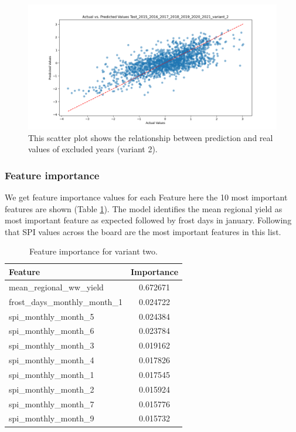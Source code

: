 \documentclass{article}
\begin{document}
\begin{figure}[H]
	\centering
	\includegraphics[width=1.0\textwidth]{./plots/scatter_Test_2015_2016_2017_2018_2019_2020_2021_variant_2.png}
	\caption{\label{fig:scatter_excluded_years_variant_2}This scatter plot shows the relationship between prediction and real values of excluded years (variant 2).}
\end{figure}
\subsubsection{Feature importance}
We get feature importance values for each Feature here the 10 most important features are shown (Table \ref{table:feature_importance_variant_2}).
The model identifies the mean regional yield as most important feature as expected followed by frost days in january. Following that SPI values across the board are the most important features in this list.
\begin{table}[H]
	\centering
	\begin{tabular}{lc}
		\hline
		Feature                        & Importance \\
		\hline
		mean\_regional\_ww\_yield      & 0.672671   \\
		frost\_days\_monthly\_month\_1 & 0.024722   \\
		spi\_monthly\_month\_5         & 0.024384   \\
		spi\_monthly\_month\_6         & 0.023784   \\
		spi\_monthly\_month\_3         & 0.019162   \\
		spi\_monthly\_month\_4         & 0.017826   \\
		spi\_monthly\_month\_1         & 0.017545   \\
		spi\_monthly\_month\_2         & 0.015924   \\
		spi\_monthly\_month\_7         & 0.015776   \\
		spi\_monthly\_month\_9         & 0.015732   \\
		\hline
	\end{tabular}
	\caption{\label{table:feature_importance_variant_2} Feature importance for variant two.}
\end{table}
\end{document}
